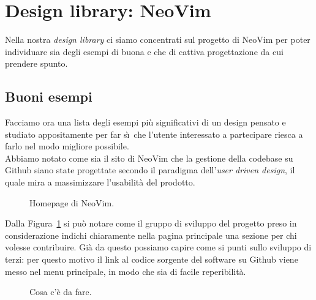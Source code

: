 \documentclass[12pt]{article} %
\begin{document}
\newpage

\section{Design library: NeoVim}
Nella nostra \emph{design library} ci siamo concentrati sul progetto di NeoVim per poter individuare sia degli esempi di buona e che di cattiva progettazione da cui prendere spunto.\\

\subsection{Buoni esempi}
Facciamo ora una lista degli esempi pi\`u significativi di un design pensato e studiato appositamente per far s\`\i\ che l'utente interessato a partecipare riesca a farlo nel modo migliore possibile.\\
Abbiamo notato come sia il sito di NeoVim che la gestione della codebase su Github siano state progettate secondo il paradigma dell'\emph{user driven design}, il quale mira a massimizzare l'usabilit\`a del prodotto.

\begin{figure}[H]
\caption{Homepage di NeoVim.}
\label{fig:buonesempio1}
\end{figure}

Dalla Figura~\ref{fig:buonesempio1} si pu\`o notare come il gruppo di sviluppo del progetto preso in considerazione indichi chiaramente nella pagina principale una sezione per chi volesse contribuire. Gi\`a da questo possiamo capire come si punti sullo sviluppo di terzi: per questo motivo il link al codice sorgente del software su Github viene messo nel menu principale, in modo che sia di facile reperibilit\`a.

\begin{figure}[H]
\caption{Cosa c'\`e da fare.}
\label{fig:buonesempio2}
\end{figure}
\end{document}
